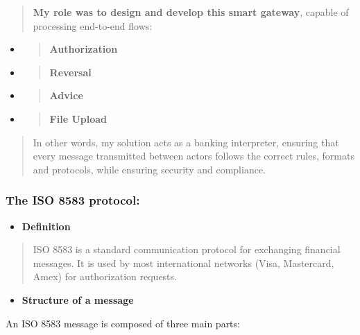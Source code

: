 \documentclass[12pt,a4paper]{report}
\begin{document}
\begin{quote}
\textbf{My role was to design and develop this smart gateway}, capable
of processing end-to-end flows:
\end{quote}

\begin{itemize}
\item
  \begin{quote}
  \textbf{Authorization}
  \end{quote}
\item
  \begin{quote}
  \textbf{Reversal}
  \end{quote}
\item
  \begin{quote}
  \textbf{Advice}
  \end{quote}
\item
  \begin{quote}
  \textbf{File Upload}
  \end{quote}
\end{itemize}

\begin{quote}
In other words, my solution acts as a banking interpreter, ensuring that
every message transmitted between actors follows the correct rules,
formats and protocols, while ensuring security and compliance.
\end{quote}

\hypertarget{the-iso-8583-protocol}{%
\subsubsection{\texorpdfstring{\textbf{The ISO 8583
protocol:}}{The ISO 8583 protocol:}}\label{the-iso-8583-protocol}}

\begin{itemize}
\item
  \textbf{Definition}
\end{itemize}

\begin{quote}
ISO 8583 is a standard communication protocol for exchanging financial
messages. It is used by most international networks (Visa, Mastercard,
Amex) for authorization requests.
\end{quote}

\begin{itemize}
\item
  \textbf{Structure of a message}
\end{itemize}

An ISO 8583 message is composed of three main parts:
\end{document}
